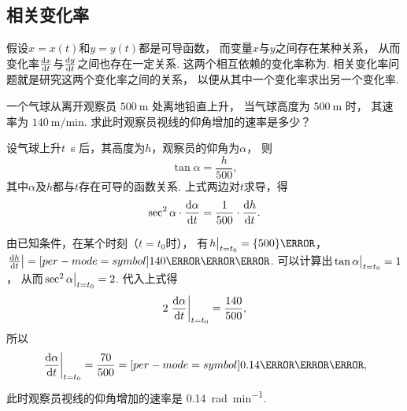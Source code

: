\subsection{相关变化率}
假设\(x=x(t)\)和\(y=y(t)\)都是可导函数，
而变量\(x\)与\(y\)之间存在某种关系，
从而变化率\(\dv{x}{t}\)与\(\dv{y}{t}\)之间也存在一定关系.
这两个相互依赖的变化率称为.
相关变化率问题就是研究这两个变化率之间的关系，
以便从其中一个变化率求出另一个变化率.

\begin{example}
一个气球从离开观察员 $\qty{500}{\meter}$ 处离地铅直上升，
当气球高度为 $\qty{500}{\meter}$ 时，
其速率为 $\qty[per-mode=symbol]{140}{\meter\per\minute}$.
求此时观察员视线的仰角增加的速率是多少？
\begin{solution}
设气球上升\(t\)~\unit{\second} 后，其高度为\(h\)，观察员的仰角为\(\alpha\)，
则\begin{equation*}
	\tan\alpha=\frac{h}{500},
\end{equation*}
其中\(\alpha\)及\(h\)都与\(t\)存在可导的函数关系.
上式两边对\(t\)求导，得\begin{equation*}
	\sec^2\alpha \cdot \dv{\alpha}{t}
	= \frac1{500} \cdot \dv{h}{t}.
\end{equation*}

由已知条件，在某个时刻（\(t=t_0\)时），
有\(\eval{h}_{t=t_0}=\qty{500}{\meter}\)，
\(\eval{\dv{h}{t}}=\qty[per-mode=symbol]{140}{\meter\per\minute}\).
可以计算出\(\eval{\tan\alpha}_{t=t_0}=1\)，
从而\(\eval{\sec^2\alpha}_{t=t_0}=2\).
代入上式得\begin{equation*}
	2 \eval{\dv{\alpha}{t}}_{t=t_0} = \frac{140}{500},
\end{equation*}
所以\begin{equation*}
	\eval{\dv{\alpha}{t}}_{t=t_0} = \frac{70}{500}
	= \qty[per-mode=symbol]{0.14}{\radian\per\minute},
\end{equation*}
此时观察员视线的仰角增加的速率是 \qty[per-mode=symbol]{0.14}{\radian\per\minute}.
\end{solution}
\end{example}
